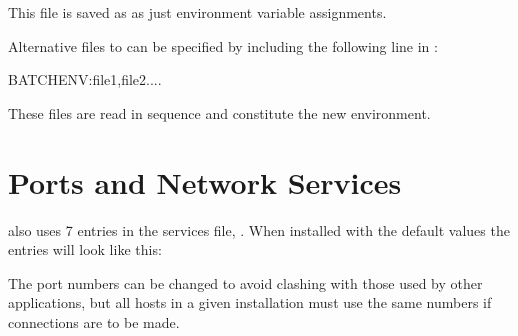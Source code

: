 This file is saved as \batchenv{} as just environment variable assignments.

Alternative files to \batchenv{} can be specified by including the following line in \masterconfig:

\begin{expara}

BATCHENV:file1,file2....

\end{expara}

These files are read in sequence and constitute the new environment.

\section{Ports and Network Services}
\ProductName{} also uses 7 entries in the services file, . When installed with the default
values the entries will look like this:

\begin{expara}
\end{expara}

The port numbers can be changed to avoid clashing with those used by other applications, but
all hosts in a given installation must use the same numbers if \ProductName{} connections are to be made.

